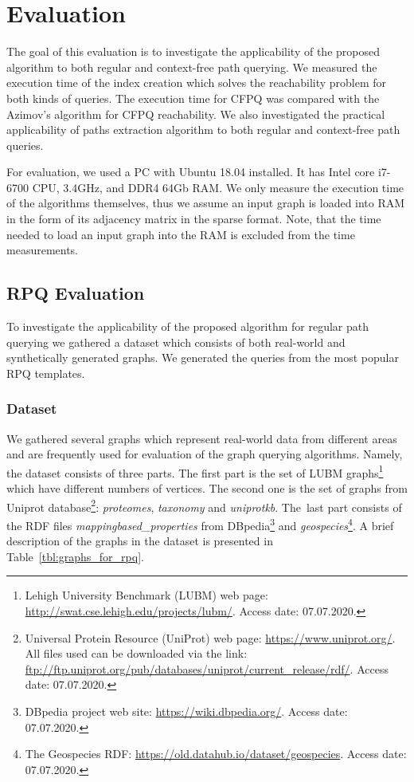 \section{Evaluation}

The goal of this evaluation is to investigate the applicability of the proposed algorithm to both regular and context-free path querying.
We measured the execution time of the index creation which solves the reachability problem for both kinds of queries.
The execution time for CFPQ was compared with the Azimov's algorithm for CFPQ reachability.
We also investigated the practical applicability of paths extraction algorithm to both regular and context-free path queries.

For evaluation, we used a PC with Ubuntu 18.04 installed.
It has Intel core i7-6700 CPU, 3.4GHz, and DDR4 64Gb RAM.
We only measure the execution time of the algorithms themselves, thus we assume an input graph is loaded into RAM in the form of its adjacency matrix in the sparse format.
Note, that the time needed to load an input graph into the RAM is excluded from the time measurements.

\subsection{RPQ Evaluation}

To investigate the applicability of the proposed algorithm for regular path querying we gathered a dataset which consists of both real-world and synthetically generated graphs.
We generated the queries from the most popular RPQ templates.

\subsubsection{Dataset}

We gathered several graphs which represent real-world data from different areas and are frequently used for evaluation of the graph querying algorithms.
Namely, the dataset consists of three parts.
The first part is the set of LUBM graphs\footnote{Lehigh University Benchmark (LUBM) web page: \url{http://swat.cse.lehigh.edu/projects/lubm/}. Access date: 07.07.2020.}~\citep{10.1016/j.websem.2005.06.005} which have different numbers of vertices.
The second one is the set of graphs from Uniprot database\footnote{Universal Protein Resource (UniProt) web page: \url{https://www.uniprot.org/}. All files used can be downloaded via the link: \url{ftp://ftp.uniprot.org/pub/databases/uniprot/current_release/rdf/}. Access date: 07.07.2020.}: \textit{proteomes}, \textit{taxonomy} and \textit{uniprotkb}.
The~last part consists of the RDF files \textit{mappingbased\_properties} from DBpedia\footnote{DBpedia project web site: \url{https://wiki.dbpedia.org/}. Access date: 07.07.2020.} and \textit{geospecies}\footnote{The Geospecies RDF: \url{https://old.datahub.io/dataset/geospecies}. Access date: 07.07.2020.}.
A brief description of the graphs in the dataset is presented in Table~\ref{tbl:graphs_for_rpq}.

